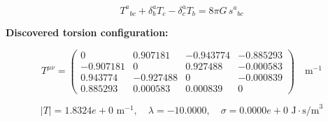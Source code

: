 
\begin{equation}
  T^a{}_{bc} + \delta^a_b T_c - \delta^a_c T_b = 8\pi G \, s^a{}_{bc}
\end{equation}

\textbf{Discovered torsion configuration:}

\begin{equation}
  T^{\mu\nu} = \begin{pmatrix}
    0 & 0.907181 & -0.943774 & -0.885293 \\
    -0.907181 & 0 & 0.927488 & -0.000583 \\
    0.943774 & -0.927488 & 0 & -0.000839 \\
    0.885293 & 0.000583 & 0.000839 & 0
  \end{pmatrix} \quad \text{m}^{-1}
\end{equation}

\begin{equation}
  |T| = 1.8324e+0 \text{ m}^{-1}, \quad
  \lambda = -10.0000, \quad
  \sigma = 0.0000e+0 \text{ J}\cdot\text{s/m}^3
\end{equation}